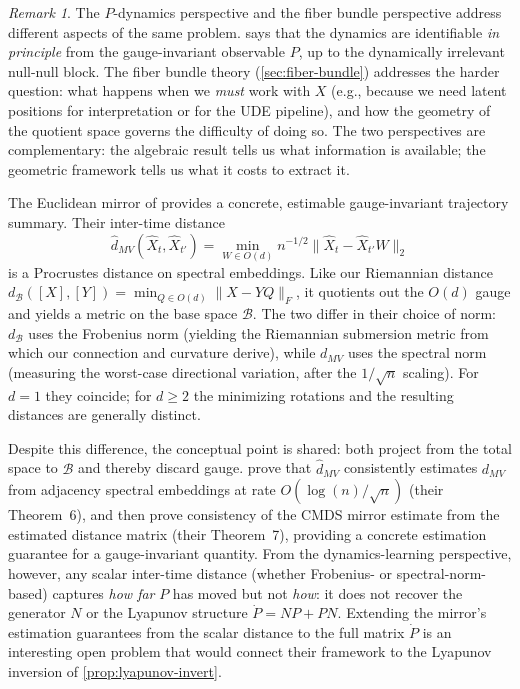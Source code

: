 \documentclass{article}
\theoremstyle{plain}
\theoremstyle{definition}
\theoremstyle{remark}
\newtheorem*{remark}{Remark}
\begin{document}
\begin{remark}
The $P$-dynamics perspective and the fiber bundle perspective address different aspects of the same problem.
 says that the dynamics are identifiable \emph{in principle} from the gauge-invariant observable $P$, up to the dynamically irrelevant null-null block.
The fiber bundle theory (\cref{sec:fiber-bundle}) addresses the harder question: what happens when we \emph{must} work with $X$ (e.g., because we need latent positions for interpretation or for the UDE pipeline), and how the geometry of the quotient space governs the difficulty of doing so.
The two perspectives are complementary: the algebraic result tells us what information is available; the geometric framework tells us what it costs to extract it.
\end{remark}

The Euclidean mirror of \citet{athreya2024euclidean} provides a concrete, estimable gauge-invariant trajectory summary. Their inter-time distance
\begin{equation}
\hat{d}_{MV}(\hat{X}_t, \hat{X}_{t'}) = \min_{W \in O(d)} n^{-1/2} \|\hat{X}_t - \hat{X}_{t'} W\|_2
\end{equation}
is a Procrustes distance on spectral embeddings. Like our Riemannian distance $d_{\mathcal{B}}([X],[Y]) = \min_{Q \in O(d)} \|X - YQ\|_F$, it quotients out the $O(d)$ gauge and yields a metric on the base space $\mathcal{B}$. The two differ in their choice of norm: $d_{\mathcal{B}}$ uses the Frobenius norm (yielding the Riemannian submersion metric from which our connection and curvature derive), while $d_{MV}$ uses the spectral norm (measuring the worst-case directional variation, after the $1/\sqrt{n}$ scaling). For $d = 1$ they coincide; for $d \ge 2$ the minimizing rotations and the resulting distances are generally distinct.

Despite this difference, the conceptual point is shared: both project from the total space to $\mathcal{B}$ and thereby discard gauge.
\citet{athreya2024euclidean} prove that $\hat{d}_{MV}$ consistently estimates $d_{MV}$ from adjacency spectral embeddings at rate $O(\log(n) / \sqrt{n})$ (their Theorem~6), and then prove consistency of the CMDS mirror estimate from the estimated distance matrix (their Theorem~7), providing a concrete estimation guarantee for a gauge-invariant quantity. From the dynamics-learning perspective, however, any scalar inter-time distance (whether Frobenius- or spectral-norm-based) captures \emph{how far} $P$ has moved but not \emph{how}: it does not recover the generator $N$ or the Lyapunov structure $\dot{P} = NP + PN$.
Extending the mirror's estimation guarantees from the scalar distance to the full matrix $\dot{P}$ is an interesting open problem that would connect their framework to the Lyapunov inversion of \cref{prop:lyapunov-invert}.
\end{document}
